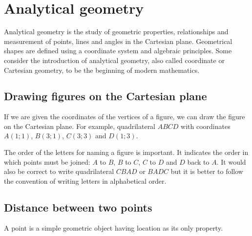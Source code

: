 \chapter{Analytical geometry}
Analytical geometry is the study of geometric properties, relationships and measurement of points, lines and angles in the Cartesian plane. Geometrical shapes are defined using a coordinate system and algebraic principles. Some consider the introduction of analytical geometry, also called coordinate or Cartesian geometry, to be the beginning of modern mathematics.\par 


\section{Drawing figures on the Cartesian plane}
If we are given the coordinates of the vertices of a figure, we can draw the figure on the Cartesian plane. For example, quadrilateral $ABCD$ with coordinates $A(1;1)$, $B(3;1)$, $C(3;3)$ and $D(1;3)$.  

\setcounter{subfigure}{0}
\begin{figure}[H] %
\begin{center}
\end{center}
\label{fig:cartesianplane}
\end{figure} 

The order of the letters for naming a figure is important. It indicates the order in which points must be joined: $A$ to $B$, $B$ to $C$, $C$ to $D$ and $D$ back to $A$. It would also be correct to write quadrilateral $CBAD$ or $BADC$ but it is better to follow the convention of writing letters in alphabetical order.     

\section{Distance between two points}
A point is a simple geometric object having location as its only property. 

